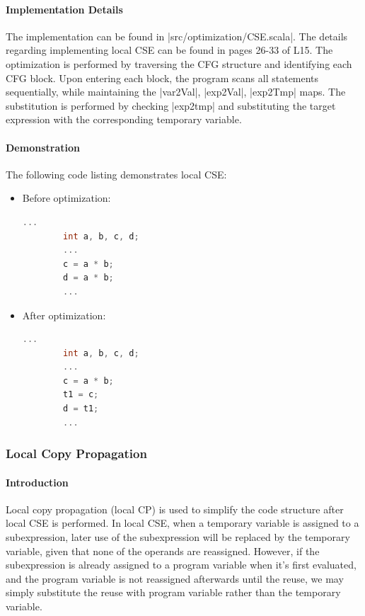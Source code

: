 \paragraph{Implementation Details}

The implementation can be found in |src/optimization/CSE.scala|. The details regarding implementing local CSE can be found in pages 26-33 of L15. The optimization is performed by traversing the CFG structure and identifying each CFG block. Upon entering each block, the program scans all statements sequentially, while maintaining the |var2Val|, |exp2Val|, |exp2Tmp| maps. The substitution is performed by checking |exp2tmp| and substituting the target expression with the corresponding temporary variable.

\paragraph{Demonstration}

The following code listing demonstrates local CSE:

\begin{itemize}
    \item Before optimization:
    \begin{lstlisting}[language=C]
        ...
        int a, b, c, d;
        ...
        c = a * b;
        d = a * b;
        ...
    \end{lstlisting}
    \item After optimization:
    \begin{lstlisting}[language=C]
        ...
        int a, b, c, d;
        ...
        c = a * b;
        t1 = c;
        d = t1;
        ...
    \end{lstlisting}
\end{itemize}

\subsubsection{Local Copy Propagation}

\paragraph{Introduction}

Local copy propagation (local CP) is used to simplify the code structure after local CSE is performed. In local CSE, when a temporary variable is assigned to a subexpression, later use of the subexpression will be replaced by the temporary variable, given that none of the operands are reassigned. However, if the subexpression is already assigned to a program variable when it's first evaluated, and the program variable is not reassigned afterwards until the reuse, we may simply substitute the reuse with program variable rather than the temporary variable.

